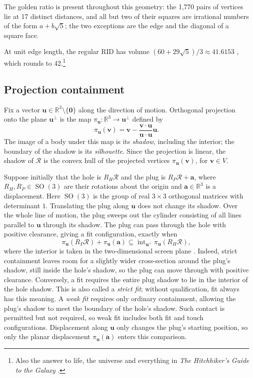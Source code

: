 The golden ratio is present throughout this geometry: the 1,770 pairs of
vertices lie at 17 distinct distances, and all but two of their squares are
irrational numbers of the form $a+b\sqrt5$; the two exceptions are the
edge and the diagonal of a square face.

At unit edge length, the regular RID has volume
$(60+29\sqrt5)/3\approx41.6153$ \citep{McCooeyRID}, which rounds to 42.\footnote{Also
the answer to life, the universe and everything in \emph{The Hitchhiker's
Guide to the Galaxy} \citep{Adams1979}.}

\subsection{Projection containment}\label{subsec:projection-containment}

Fix a vector $\mathbf u\in\mathbb R^3\setminus\{\mathbf0\}$ along the direction
of motion. Orthogonal projection onto the plane $\mathbf u^\perp$ is the map
$\pi_{\mathbf u}:\mathbb R^3\to\mathbf u^\perp$ defined by
\[
  \pi_{\mathbf u}(\mathbf v)
    =\mathbf v-\frac{\mathbf v\cdot\mathbf u}{\mathbf u\cdot\mathbf u}\mathbf u.
\]
The image of a body under this map is its \emph{shadow}, including the
interior; the boundary of the shadow is its \emph{silhouette}. Since the
projection is linear, the shadow of $\mathcal R$ is the convex hull of the projected
vertices $\pi_{\mathbf u}(\mathbf v)$, for $\mathbf v\in V$.

Suppose initially that the hole is $R_{H}\mathcal R$ and the plug is $R_{P}\mathcal R+\mathbf a$, where
$R_{H},R_{P}\in\operatorname{SO}(3)$ are their rotations about the origin and
$\mathbf a\in\mathbb R^3$ is a displacement. Here $\operatorname{SO}(3)$ is
the group of real $3\times3$ orthogonal matrices with determinant $1$. Translating
the plug along $\mathbf u$ does not change its shadow. Over the whole line of motion,
the plug sweeps out the cylinder consisting of all lines parallel to $\mathbf u$ through
its shadow. The plug can pass through the hole with positive clearance,
giving a fit configuration, exactly when
\begin{equation}\label{eq:strict-projection-containment}
  \pi_{\mathbf u}(R_{P}\mathcal R)+\pi_{\mathbf u}(\mathbf a)
    \subseteq\operatorname{int}_{\mathbf u^\perp}\pi_{\mathbf u}(R_{H}\mathcal R),
\end{equation}
where the interior is taken in the two-dimensional screen plane
\citep[Proposition~1]{SteiningerYurkevich2023}.
Indeed, strict containment leaves room for a slightly wider cross-section
around the plug's shadow, still inside the hole's shadow, so the plug can
move through with positive clearance. Conversely, a fit requires the
entire plug shadow to lie in the interior of the hole shadow.
This is also called a \emph{strict fit}; without qualification, fit always
has this meaning.
A \emph{weak fit} requires only ordinary containment, allowing the plug's
shadow to meet the boundary of the hole's shadow. Such contact is permitted
but not required, so weak fit includes both fit and touch configurations.
Displacement along $\mathbf u$ only changes the plug's starting position, so only
the planar displacement $\pi_{\mathbf u}(\mathbf a)$ enters this comparison.

